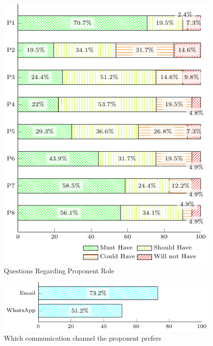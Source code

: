 \begin{figure}[!htb]
  \caption{Questions Regarding Proponent Role}\label{fig:proponent-questions}
  \begin{center}
    \includegraphics[width=13cm]{img/5-questions-proponent.pdf}
  \end{center}
\end{figure}

\begin{figure}[!htb]
  \caption{Which communication channel the proponent prefers}\label{fig:p7-question}
  \begin{center}
    \includegraphics[width=13cm]{img/5-questions-proponent-P7-1.pdf}
  \end{center}
\end{figure}

